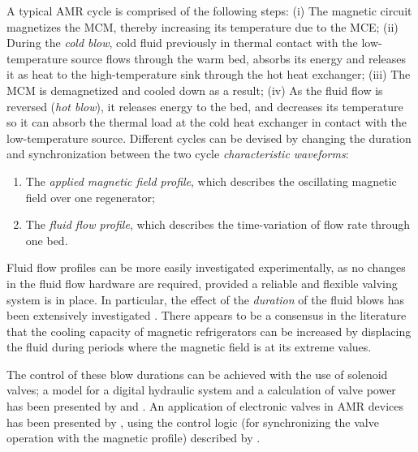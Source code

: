 \documentclass[referee]{svjour3}
\begin{document}

A typical AMR cycle is comprised of the following steps: (i) The magnetic circuit magnetizes the MCM, thereby increasing its temperature due to the MCE; (ii) During the \emph{cold blow}, cold fluid previously in thermal contact with the low-temperature source flows through the warm bed, absorbs its energy and releases it as heat to the high-temperature sink through the hot heat exchanger; (iii) The MCM is demagnetized and cooled down as a result; (iv) As the fluid flow is reversed (\emph{hot blow}), it releases energy to the bed, and decreases its temperature so it can absorb the thermal load at the cold heat exchanger in contact with the low-temperature source. Different cycles can be devised by changing the duration and synchronization  between the two cycle \emph{characteristic waveforms}:

\begin{enumerate}
\item The \emph{applied magnetic field profile}, which describes the oscillating magnetic field over one regenerator;
\item The \emph{fluid flow profile}, which describes the time-variation of flow rate through one bed.
\end{enumerate}

Fluid flow profiles can be more easily investigated  experimentally, as no changes in the fluid flow hardware are required, provided a reliable and flexible valving system is in place. In particular, the effect of the \emph{duration} of the fluid blows has been extensively investigated \cite{bib:teyber17_exper,bib:nakashima18-influen-exp,FORTKAMP2018}. There appears to be a consensus in the literature that the cooling capacity of magnetic refrigerators can be increased by displacing the fluid during periods where the magnetic field is at its extreme values. 

The control of these blow durations can be achieved with the use of solenoid valves; a model for a digital hydraulic system and a calculation of valve power has been presented by  \cite{bib:cardoso16_trans} and \cite{bib:cardoso18}.  An application of  electronic valves in AMR devices has been presented by \cite{bib:nakashima18-perfor-asses-solen-valves-flow}, using the control logic (for synchronizing the valve operation with the magnetic profile) described by \cite{bib:hoffmann17-actuat}.
\end{document}
